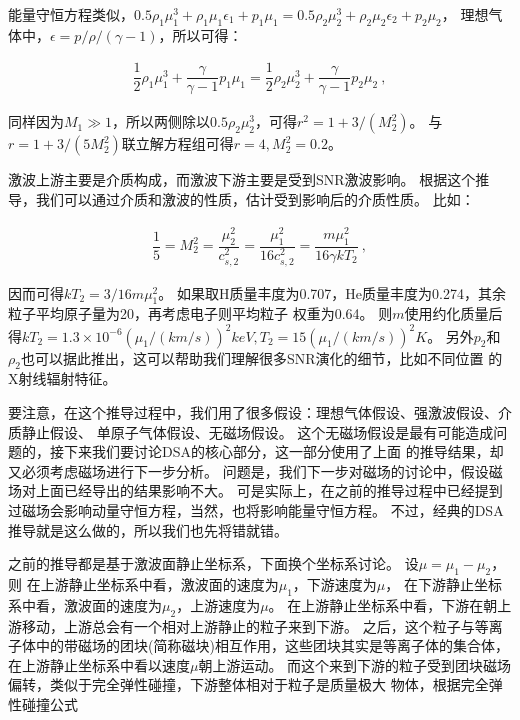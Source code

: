 能量守恒方程类似，$0.5\rho_1\mu_1^3+\rho_1\mu_1\epsilon_1+p_1\mu_1=
0.5\rho_2\mu_2^3+\rho_2\mu_2\epsilon_2+p_2\mu_2$，
理想气体中，$\epsilon=p/\rho/(\gamma-1)$，所以可得：

\begin{equation}
    \begin{aligned}
      \dfrac{1}{2}\rho_1\mu_1^3+\dfrac{\gamma}{\gamma-1}p_1\mu_1=
      \dfrac{1}{2}\rho_2\mu_2^3+\dfrac{\gamma}{\gamma-1}p_2\mu_2\ ,
    \end{aligned}
\end{equation}

同样因为$M_1\gg 1$，所以两侧除以$0.5\rho_2\mu_2^3$，可得$r^2=1+3/(M_{2}^{2})$。
与$r=1+3/(5 M_{2}^{2})$联立解方程组可得$r=4, M_{2}^{2}=0.2$。

激波上游主要是介质构成，而激波下游主要是受到SNR激波影响。
根据这个推导，我们可以通过介质和激波的性质，估计受到影响后的介质性质。
比如：

\begin{equation}
    \begin{aligned}
      \dfrac{1}{5}=M_{2}^{2}=\dfrac{\mu_{2}^{2}}{c_{s, 2}^{2}}=
      \dfrac{\mu_{1}^{2}}{16 c_{s, 2}^{2}}=\dfrac{m \mu_{1}^{2}}{16 \gamma k T_{2}}\ ,
    \end{aligned}
\end{equation}

因而可得$k T_{2}=3/16 m \mu_{1}^{2}$。
如果取H质量丰度为0.707，He质量丰度为0.274，其余粒子平均原子量为20，再考虑电子则平均粒子
权重为0.64。
则$m$使用约化质量后得$k T_{2}=1.3 \times 10^{-6}(\mu_1/(km/s))^2 keV, T_2 =
15 (\mu_1/(km/s))^2 K$。
另外$p_2$和$\rho_2$也可以据此推出，这可以帮助我们理解很多SNR演化的细节，比如不同位置
的X射线辐射特征。

要注意，在这个推导过程中，我们用了很多假设：理想气体假设、强激波假设、介质静止假设、
单原子气体假设、无磁场假设。
这个无磁场假设是最有可能造成问题的，接下来我们要讨论DSA的核心部分，这一部分使用了上面
的推导结果，却又必须考虑磁场进行下一步分析。
问题是，我们下一步对磁场的讨论中，假设磁场对上面已经导出的结果影响不大。
可是实际上，在之前的推导过程中已经提到过磁场会影响动量守恒方程，当然，也将影响能量守恒方程。
不过，经典的DSA推导就是这么做的，所以我们也先将错就错。

之前的推导都是基于激波面静止坐标系，下面换个坐标系讨论。
设$\mu=\mu_1-\mu_2$，则
在上游静止坐标系中看，激波面的速度为$\mu_1$，下游速度为$\mu$，
在下游静止坐标系中看，激波面的速度为$\mu_2$，上游速度为$\mu$。
在上游静止坐标系中看，下游在朝上游移动，上游总会有一个相对上游静止的粒子来到下游。
之后，这个粒子与等离子体中的带磁场的团块(简称磁块)相互作用，这些团块其实是等离子体的集合体，
在上游静止坐标系中看以速度$\mu$朝上游运动。
而这个来到下游的粒子受到团块磁场偏转，类似于完全弹性碰撞，下游整体相对于粒子是质量极大
物体，根据完全弹性碰撞公式

